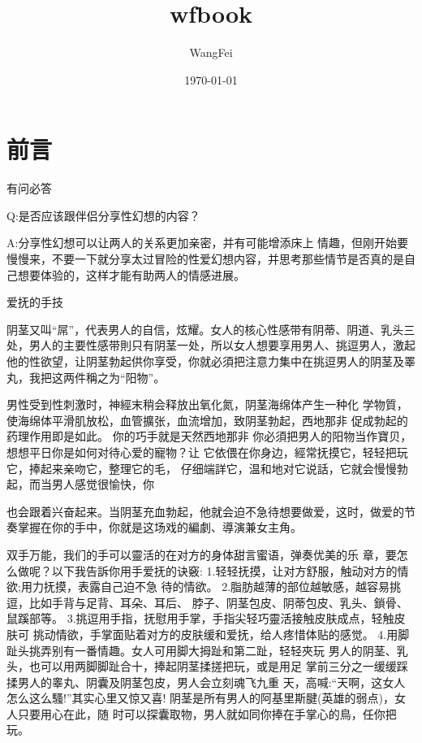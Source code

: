 \documentclass[12pt,UTF8]{ctexbook}
\title{\heiti\zihao{0} wfbook}
\author{WangFei}
\date{\today}
\begin{document}
\maketitle
\tableofcontents

\frontmatter

\chapter{前言}

有问必答

Q:是否应该跟伴侣分享性幻想的内容？

A:分享性幻想可以让两人的关系更加亲密，并有可能增添床上
情趣，但刚开始要慢慢来，不要一下就分享太过冒险的性爱幻想内容，并思考那些情节是否真的是自己想要体验的，这样才能有助两人的情感进展。

爱抚的手技

阴茎又叫“屌”，代表男人的自信，炫耀。女人的核心性感带有阴蒂、阴道、乳头三处，男人的主要性感带則只有阴茎一处，所以女人想要享用男人、挑逗男人，激起他的性欲望，让阴茎勃起供你享受，你就必須把注意力集中在挑逗男人的阴茎及睪丸，我把这两件稱之为“阳物”。

男性受到性刺激时，神經末稍会释放出氧化氮，阴茎海绵体产生一种化
学物質，使海绵体平滑肌放松，血管擴张，血流增加，致阴茎勃起，西地那非
促成勃起的药理作用即是如此。
你的巧手就是天然西地那非
你必須把男人的阳物当作寶贝，想想平日你是如何对待心爱的寵物？让
它依偎在你身边，經常抚摸它，轻轻把玩它，捧起来亲吻它，整理它的毛，
仔细端詳它，温和地对它说話，它就会慢慢勃起，而当男人感觉很愉快，你

也会跟着兴奋起来。当阴茎充血勃起，他就会迫不急待想要做爱，这时，做爱的节奏掌握在你的手中，你就是这场戏的編劇、導演兼女主角。

双手万能，我们的手可以靈活的在对方的身体甜言蜜语，弹奏优美的乐
章，要怎么做呢？以下我告訴你用手爱抚的诀竅:
1.轻轻抚摸，让对方舒服，触动对方的情欲;用力抚摸，表露自己迫不急
待的情欲。
2.脂肪越薄的部位越敏感，越容易挑逗，比如手背与足背、耳朵、耳后、
脖子、阴茎包皮、阴蒂包皮、乳头、鎖骨、鼠蹊部等。
3.挑逗用手指，抚慰用手掌，手指尖轻巧靈活接触皮肤成点，轻触皮肤可
挑动情欲，手掌面贴着对方的皮肤缓和爱抚，给人疼惜体贴的感觉。
4.用脚趾头挑弄别有一番情趣。女人可用脚大拇趾和第二趾，轻轻夾玩
男人的阴茎、乳头，也可以用两脚脚趾合十，捧起阴茎揉搓把玩，或是用足
掌前三分之一缓缓踩揉男人的睾丸、阴囊及阴茎包皮，男人会立刻魂飞九重
天，高喊:“天啊，这女人怎么这么騷!”其实心里又惊又喜!
阴茎是所有男人的阿基里斯腱(英雄的弱点)，女人只要用心在此，随
时可以探囊取物，男人就如同你捧在手掌心的鳥，任你把玩。
\end{document}
